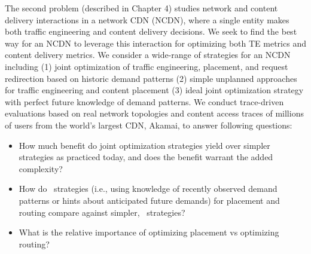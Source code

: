 The second problem (described in Chapter 4) studies network and content delivery interactions in a network CDN (NCDN), where a single entity makes both traffic engineering and content delivery decisions.
We seek to find the best way for an NCDN to leverage this interaction for optimizing both TE metrics and content delivery metrics.
We consider a wide-range of strategies for an NCDN including (1) joint optimization of traffic engineering, placement, and request redirection based on historic demand patterns (2) simple unplanned approaches for traffic engineering and  content placement (3) ideal joint optimization strategy with perfect future knowledge of demand patterns. 
We conduct trace-driven evaluations based on real network topologies and content access traces of millions of users from the world's largest CDN, Akamai, to answer following questions:
\begin{itemize}
\item
How much benefit do joint optimization strategies yield over simpler strategies as practiced today, and does the benefit warrant the added complexity?  
\item
How do \planned\ strategies (i.e., using knowledge of recently observed demand patterns or hints about anticipated future demands) for placement and routing compare against simpler, \unplanned\ strategies?
\item
What is the relative importance of optimizing placement vs optimizing routing?
\end{itemize}




